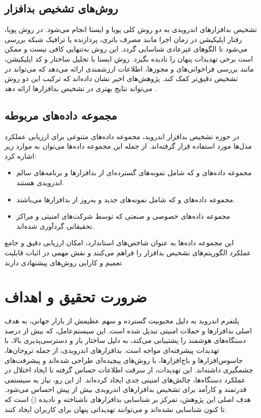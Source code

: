 \subsection{روش‌های تشخیص بدافزار}
تشخیص بدافزارهای اندرویدی به دو روش کلی پویا و ایستا انجام می‌شود. در روش پویا، رفتار اپلیکیشن در زمان اجرا مانند مصرف باتری، پردازنده یا ترافیک شبکه بررسی می‌شود تا الگوهای غیرعادی شناسایی گردد. این روش به‌تنهایی کافی نیست و ممکن است برخی تهدیدات پنهان را نادیده بگیرد. روش ایستا با تحلیل ساختار و کد اپلیکیشن، مانند بررسی فراخوانی‌های  و مجوزها، اطلاعات ارزشمندی ارائه می‌دهد که می‌تواند در تشخیص دقیق‌تر کمک کند. پژوهش‌های اخیر نشان داده‌اند که ترکیب این دو روش می‌تواند نتایج بهتری در تشخیص بدافزارها ارائه دهد \cite{AndroidMalwareSurvey}.

\subsection{مجموعه داده‌های مربوطه}
در حوزه تشخیص بدافزار اندروید، مجموعه داده‌های متنوعی برای ارزیابی عملکرد مدل‌ها مورد استفاده قرار گرفته‌اند. از جمله این مجموعه داده‌ها می‌توان به موارد زیر اشاره کرد:
\begin{itemize}
    \item مجموعه داده‌های  \cite{Drebin} و  \cite{AndroZoo} که شامل نمونه‌های گسترده‌ای از بدافزارها و برنامه‌های سالم اندرویدی هستند.
    \item مجموعه داده‌های  \cite{CICMalDroid} و  که شامل نمونه‌های جدید و به‌روز از بدافزارها می‌باشند.
    \item مجموعه داده‌های خصوصی و صنعتی که توسط شرکت‌های امنیتی و مراکز تحقیقاتی گردآوری شده‌اند.
\end{itemize}
این مجموعه داده‌ها به عنوان شاخص‌های استاندارد، امکان ارزیابی دقیق و جامع عملکرد الگوریتم‌های تشخیص بدافزار را فراهم می‌کنند و نقش مهمی در اثبات قابلیت تعمیم و کارایی روش‌های پیشنهادی دارند.

\section{ضرورت تحقیق و اهداف}\label{import}
پلتفرم اندروید به دلیل محبوبیت گسترده و سهم عظیمش از بازار جهانی، به هدف اصلی بدافزارها و حملات امنیتی تبدیل شده است. این سیستم‌عامل، که بیش از  درصد دستگاه‌های هوشمند را پشتیبانی می‌کند، به دلیل ساختار باز و دسترسی‌پذیری بالا، با تهدیدات پیشرفته‌ای مواجه است. بدافزارهای اندرویدی، از جمله تروجان‌ها، جاسوس‌افزارها و باج‌افزارها، با روش‌های پیچیده‌ای طراحی شده‌اند و پیشرفت‌های چشمگیری داشته‌اند. این تهدیدات، از سرقت اطلاعات حساس گرفته تا ایجاد اختلال در عملکرد دستگاه‌ها، چالش‌های امنیتی جدی ایجاد کرده‌اند. از این رو، نیاز به سیستمی قدرتمند و کارآمد برای تشخیص بدافزارهای اندرویدی بیش از پیش احساس می‌شود. هدف اصلی این پژوهش، تمرکز بر شناسایی بدافزارهای ناشناخته و نادیده () است که تا کنون شناسایی نشده‌اند و می‌توانند تهدیداتی پنهان برای کاربران ایجاد کنند.

